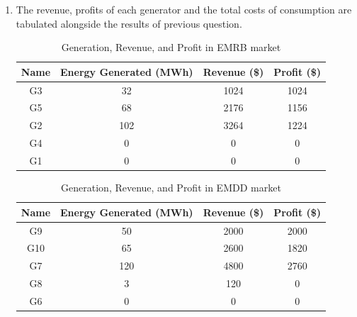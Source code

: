 \documentclass{homework}
\begin{document}
\begin{enumerate}
    The energy drawn by each consumer for the EMRB and EMDD markets are shown in tables
    \ref{tab:EMRB-costs} and \ref{tab:EMDD-costs}.
    
    \item The revenue, profits of each generator and the total costs of consumption are tabulated alongside
    the results of previous question.

\begin{table}
    \centering
    \begin{tabular}{|c|c|c|c|}
        \hline
        Name & Energy Generated (MWh) & Revenue (\$) &  Profit (\$) \\
        \hline
        G3  &    32 &      1024  &       1024 \\
        G5  &    68 &      2176  &       1156 \\
        G2  &   102 &      3264  &       1224 \\
        G4  &     0 &         0  &          0 \\
        G1  &     0 &         0  &          0 \\
        \hline
    \end{tabular}
    \caption{Generation, Revenue, and Profit in EMRB market}
    \label{tab:EMRB-dem-rev}
\end{table}

\begin{table}
    \centering
    \begin{tabular}{|c|c|c|c|}
        \hline
        Name & Energy Generated (MWh) & Revenue (\$) &  Profit (\$) \\
        \hline
        G9  &    50 &      2000  &       2000 \\
        G10 &    65 &      2600  &       1820 \\
        G7  &   120 &      4800  &       2760 \\
        G8  &     3 &       120  &          0 \\
        G6  &     0 &         0  &          0 \\
        \hline
    \end{tabular}
    \caption{Generation, Revenue, and Profit in EMDD market}
    \label{tab:EMDD-dem-rev}
\end{table}


\end{enumerate}
\end{document}
